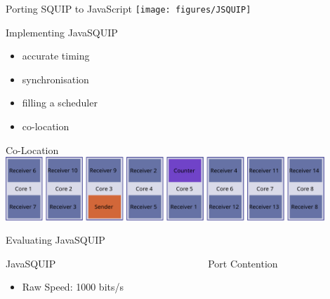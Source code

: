 \documentclass[aspectratio=169]{beamer}
\begin{document}

\begin{frame}{Porting SQUIP to JavaScript}
  \centering
  \texttt{[image: figures/JSQUIP]}
\end{frame}

\begin{frame}{Implementing JavaSQUIP}
  \begin{itemize}
    \item{accurate timing }
    \item{synchronisation }
    \item{filling a scheduler }
    \item{co-location }
  \end{itemize}
\end{frame}

\begin{frame}{Co-Location}
  \centering
   \includegraphics[page=1, width=0.9\textwidth]{figures/colocation.pdf}
\end{frame}

\begin{frame}{Evaluating JavaSQUIP}
  \begin{itemize}
  \end{itemize}
\end{frame}

\begin{frame}{JavaSQUIP~~~~~~~~~~~~~~~~~~~~~~~~~~~~~~~Port Contention}
  \begin{multicols}{2}
    \begin{itemize}
      \item Raw Speed: 1000 bits/s
    \end{itemize}
  \end{multicols}
\end{frame}

\begin{frame}[c]
  \maketitle
\end{frame}
\end{document}

